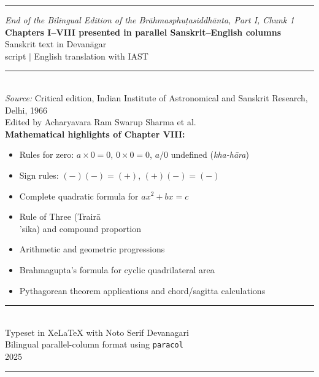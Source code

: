 \documentclass[11pt,a4paper]{article}
\newcommand{\longline}{\noindent\rule{\textwidth}{0.4pt}}
\newcommand{\iast}[1]{\textit{#1}}
\begin{document}
\begin{center}
\longline
\vspace{0.5cm}

{\small\textit{End of the Bilingual Edition of the Br\=ahmasphu\d tasiddh\=anta, Part I, Chunk 1}}\\[0.5cm]

{\small\textbf{Chapters I--VIII presented in parallel Sanskrit--English columns}}\\[0.3cm]
{\small Sanskrit text in Devan\=agar\\ script $|$ English translation with IAST}\\[0.5cm]

\longline\\[0.3cm]

{\small\textit{Source:} Critical edition, Indian Institute of Astronomical and Sanskrit Research, Delhi, 1966}\\[0.2cm]
{\small Edited by Acharyavara Ram Swarup Sharma et al.}\\[0.5cm]

{\small\textbf{Mathematical highlights of Chapter VIII:}}\\[0.2cm]
\begin{minipage}{0.8\textwidth}
\begin{itemize}[nosep]
\item Rules for zero: $a \times 0 = 0$, $0 \times 0 = 0$, $a / 0$ undefined (\iast{kha-h\=ara})
\item Sign rules: $(-)(-) = (+)$, $(+)(-) = (-)$
\item Complete quadratic formula for $ax^2 + bx = c$
\item Rule of Three (Trair\=a\\'sika) and compound proportion
\item Arithmetic and geometric progressions
\item Brahmagupta's formula for cyclic quadrilateral area
\item Pythagorean theorem applications and chord/sagitta calculations
\end{itemize}
\end{minipage}

\vspace{0.5cm}
\longline\\[0.3cm]

{\small Typeset in XeLaTeX with Noto Serif Devanagari}\\
{\small Bilingual parallel-column format using \texttt{paracol}}\\
{\small 2025}

\vspace{0.5cm}
\longline
\end{center}
\end{document}
